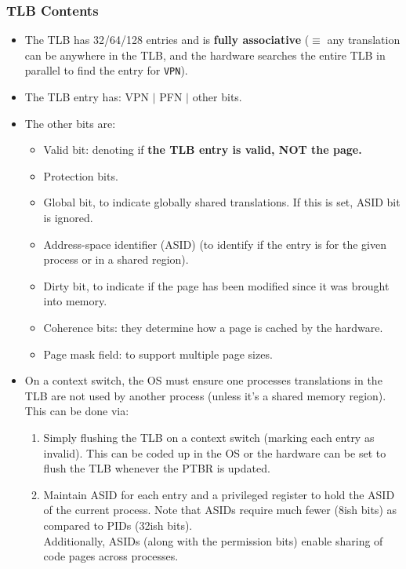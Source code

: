\documentclass[10pt]{report}
\begin{document}
\subsubsection{TLB Contents}
\begin{itemize}
    \item The TLB has 32/64/128 entries and is \textbf{fully associative} ($\equiv$ any translation can be anywhere in the TLB, and the hardware searches the entire TLB in parallel to find the entry for \texttt{VPN}).
    \item The TLB entry has: VPN $|$ PFN $|$ other bits.
    \item The other bits are:
        \begin{itemize}
            \item Valid bit: denoting if \textbf{the TLB entry is valid, NOT the page.}
            \item Protection bits.
            \item Global bit, to indicate globally shared translations. If this is set, ASID bit is ignored.
            \item Address-space identifier (ASID) (to identify if the entry is for the given process or in a shared region).
            \item Dirty bit, to indicate if the page has been modified since it was brought into memory.
            \item Coherence bits: they determine how a page is cached by the hardware.
            \item Page mask field: to support multiple page sizes.
        \end{itemize}
    \item On a context switch, the OS must ensure one processes translations in the TLB are not used by another process (unless it's a shared memory region). This can be done via:
    \begin{enumerate}
    \item Simply flushing the TLB on a context switch (marking each entry as invalid). This can be coded up in the OS or the hardware
    can be set to flush the TLB whenever the PTBR is updated.
    \item Maintain ASID for each entry and a privileged register to hold the ASID of the current process. Note that ASIDs require much fewer (8ish bits) as compared to PIDs (32ish bits).\\
    Additionally, ASIDs (along with the permission bits) enable sharing of code pages across processes.
    \end{enumerate}
\end{itemize}
\label{subsec:TLB}
\end{document}

